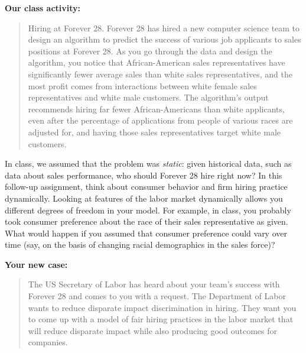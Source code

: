 \documentclass[submit]{harvardml}
\begin{document}
\newpage
\begin{problem}
\textbf{Our class activity:}

\begin{quote}
Hiring at Forever 28. Forever 28 has hired a new computer science team
to design an algorithm to predict the success of various job
applicants to sales positions at Forever 28. As you go through the
data and design the algorithm, you notice that African-American sales
representatives have significantly fewer average sales than white
sales representatives, and the most profit comes from interactions
between white female sales representatives and white male customers.
The algorithm's output recommends hiring far fewer African-Americans
than white applicants, even after the percentage of applications from
people of various races are adjusted for, and having those sales
representatives target white male customers.
\end{quote}

In class, we assumed that the problem was \textit{static}: given
historical data, such as data about sales performance, who should
Forever 28 hire right now?  In this follow-up assignment, think
about consumer behavior and firm hiring practice dynamically. Looking
at features of the labor market dynamically allows you different
degrees of freedom in your model. For example, in class, you probably
took consumer preference about the race of their sales representative
as given. What would happen if you assumed that consumer preference
could vary over time (say, on the basis of changing racial
demographics in the sales force)?

\textbf{Your new case:}
\begin{quote}
The US Secretary of Labor has heard about your team's success with Forever 28 and comes to you with a request. The Department of Labor wants to reduce disparate impact discrimination in hiring. They want you to come up with a model of fair hiring practices in the labor market that will reduce disparate impact while also producing good outcomes for companies. 
\end{quote}


\end{problem}
\end{document}
